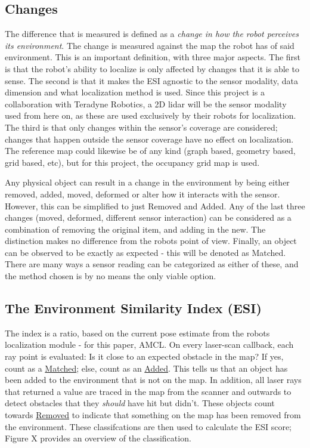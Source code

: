 \subsection{Changes}
The difference that is measured is defined as a \textit{change in how the robot perceives its environment}. The change is measured against the map the robot has of said environment. 
This is an important definition, with three major aspects. The first is that the robot's ability to localize is only affected by changes that it is able to sense.
The second is that it makes the ESI agnostic to the sensor modality, data dimension and what localization method is used. 
Since this project is a collaboration with Teradyne Robotics, a 2D lidar will be the sensor modality used from here on, as these are used exclusively by their robots for localization.
The third is that only changes within the sensor's coverage are considered; 
changes that happen outside the sensor coverage have no effect on localization. 
The reference map could likewise be of any kind (graph based, geometry based, grid based, etc), but for this project, the occupancy grid map is used. 

Any physical object can result in a change in the environment by being either removed, added, moved, deformed or alter how it interacts with the sensor. 
However, this can be simplified to just Removed and Added. Any of the last three changes (moved, deformed, different sensor interaction) can be considered as a combination 
of removing the original item, and adding in the new. The distinction makes no difference from the robots point of view. Finally, an object can be observed to be 
exactly as expected - this will be denoted as Matched. There are many ways a sensor reading can be categorized as either of these, and the method chosen is by no means 
the only viable option. 


\subsection{The Environment Similarity Index (ESI)}
The index is a ratio, based on the current pose estimate from the robots localization module - for this paper, AMCL. On every laser-scan callback, each ray point is evaluated: 
Is it close to an expected obstacle in the map? If yes, count as a \underline{Matched}; else, count as an \underline{Added}. This tells us that an object has been added to the environment 
that is not on the map.  In addition, all laser rays that returned a value are traced in the map from the scanner and outwards to detect obstacles that they \textit{should} 
have hit but didn't. These objects count towards \underline{Removed} to indicate that something on the map has been removed from the environment. 
These classifcations are then used to calculate the ESI score; Figure X provides an overview of the classification.

